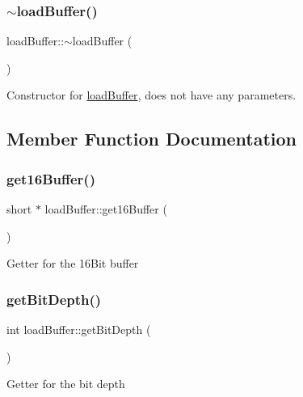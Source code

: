 \subsubsection{\texorpdfstring{$\sim$load\+Buffer()}{~loadBuffer()}}
{\footnotesize\ttfamily load\+Buffer\+::$\sim$load\+Buffer (\begin{DoxyParamCaption}{ }\end{DoxyParamCaption})\hspace{0.3cm}{\ttfamily [virtual]}}

Constructor for \hyperlink{classloadBuffer}{load\+Buffer}, does not have any parameters. 

\subsection{Member Function Documentation}
\mbox{\label{classloadBuffer_aa6b14cb999de76cfce307f7036310859}} 
\subsubsection{\texorpdfstring{get16\+Buffer()}{get16Buffer()}}
{\footnotesize\ttfamily short $\ast$ load\+Buffer\+::get16\+Buffer (\begin{DoxyParamCaption}{ }\end{DoxyParamCaption})}

Getter for the 16\+Bit buffer \mbox{\label{classloadBuffer_aa4d8b0a75f4459dc0f255f62d822e14b}} 
\subsubsection{\texorpdfstring{get\+Bit\+Depth()}{getBitDepth()}}
{\footnotesize\ttfamily int load\+Buffer\+::get\+Bit\+Depth (\begin{DoxyParamCaption}{ }\end{DoxyParamCaption})}

Getter for the bit depth \mbox{\label{classloadBuffer_afdb86606188438cef499304c2a0af433}} 
